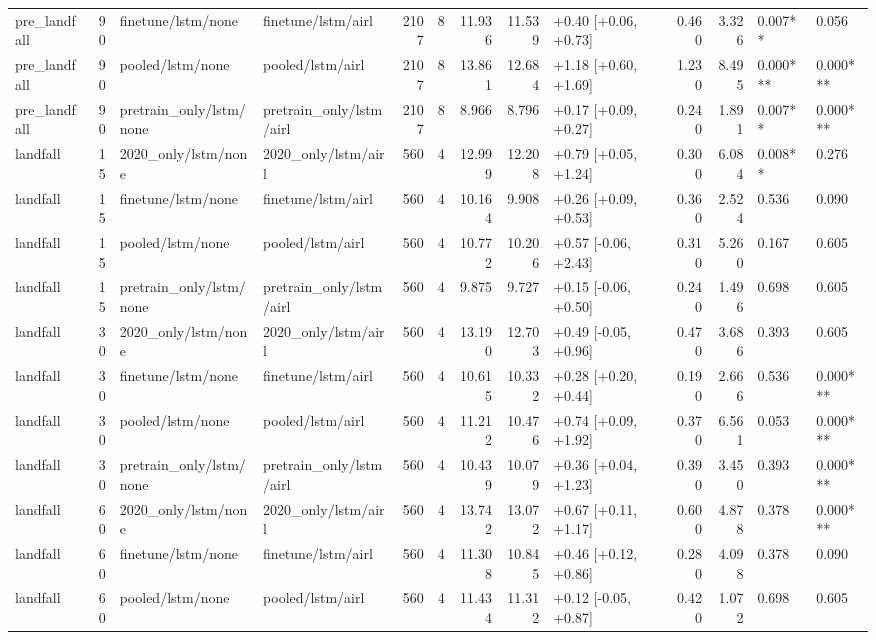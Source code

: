 \begin{tabular}{lrllrrrrlrrll}
pre_landfall & 90 & finetune/lstm/none & finetune/lstm/airl & 2107 & 8 & 11.936 & 11.539 & +0.40 [+0.06, +0.73] & 0.460 & 3.326 & 0.007** & 0.056 \\
pre_landfall & 90 & pooled/lstm/none & pooled/lstm/airl & 2107 & 8 & 13.861 & 12.684 & +1.18 [+0.60, +1.69] & 1.230 & 8.495 & 0.000*** & 0.000*** \\
pre_landfall & 90 & pretrain_only/lstm/none & pretrain_only/lstm/airl & 2107 & 8 & 8.966 & 8.796 & +0.17 [+0.09, +0.27] & 0.240 & 1.891 & 0.007** & 0.000*** \\
landfall & 15 & 2020_only/lstm/none & 2020_only/lstm/airl & 560 & 4 & 12.999 & 12.208 & +0.79 [+0.05, +1.24] & 0.300 & 6.084 & 0.008** & 0.276 \\
landfall & 15 & finetune/lstm/none & finetune/lstm/airl & 560 & 4 & 10.164 & 9.908 & +0.26 [+0.09, +0.53] & 0.360 & 2.524 & 0.536 & 0.090 \\
landfall & 15 & pooled/lstm/none & pooled/lstm/airl & 560 & 4 & 10.772 & 10.206 & +0.57 [-0.06, +2.43] & 0.310 & 5.260 & 0.167 & 0.605 \\
landfall & 15 & pretrain_only/lstm/none & pretrain_only/lstm/airl & 560 & 4 & 9.875 & 9.727 & +0.15 [-0.06, +0.50] & 0.240 & 1.496 & 0.698 & 0.605 \\
landfall & 30 & 2020_only/lstm/none & 2020_only/lstm/airl & 560 & 4 & 13.190 & 12.703 & +0.49 [-0.05, +0.96] & 0.470 & 3.686 & 0.393 & 0.605 \\
landfall & 30 & finetune/lstm/none & finetune/lstm/airl & 560 & 4 & 10.615 & 10.332 & +0.28 [+0.20, +0.44] & 0.190 & 2.666 & 0.536 & 0.000*** \\
landfall & 30 & pooled/lstm/none & pooled/lstm/airl & 560 & 4 & 11.212 & 10.476 & +0.74 [+0.09, +1.92] & 0.370 & 6.561 & 0.053 & 0.000*** \\
landfall & 30 & pretrain_only/lstm/none & pretrain_only/lstm/airl & 560 & 4 & 10.439 & 10.079 & +0.36 [+0.04, +1.23] & 0.390 & 3.450 & 0.393 & 0.000*** \\
landfall & 60 & 2020_only/lstm/none & 2020_only/lstm/airl & 560 & 4 & 13.742 & 13.072 & +0.67 [+0.11, +1.17] & 0.600 & 4.878 & 0.378 & 0.000*** \\
landfall & 60 & finetune/lstm/none & finetune/lstm/airl & 560 & 4 & 11.308 & 10.845 & +0.46 [+0.12, +0.86] & 0.280 & 4.098 & 0.378 & 0.090 \\
landfall & 60 & pooled/lstm/none & pooled/lstm/airl & 560 & 4 & 11.434 & 11.312 & +0.12 [-0.05, +0.87] & 0.420 & 1.072 & 0.698 & 0.605 \\

\end{tabular}
